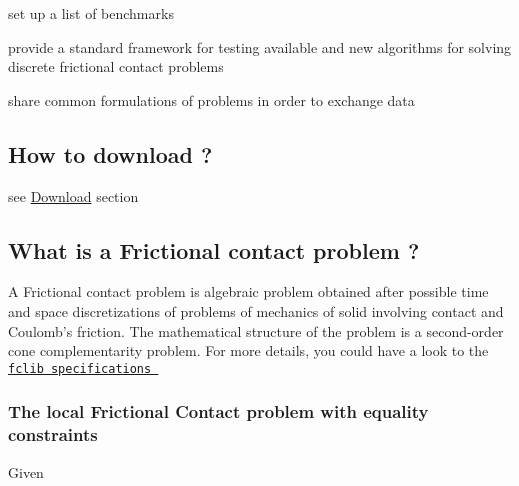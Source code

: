 \begin{DoxyItemize}
\item set up a list of benchmarks  
\item provide a standard framework for testing available and new algorithms for solving discrete frictional contact problems  
\item share common formulations of problems in order to exchange data 
\end{DoxyItemize}\hypertarget{index_howtodownload}{}\subsection{How to download  ?}\label{index_howtodownload}
see \hyperlink{download}{Download} section\hypertarget{index_Wahtis}{}\subsection{What is a Frictional contact problem ?}\label{index_Wahtis}
A Frictional contact problem is algebraic problem obtained after possible time and space discretizations of problems of mechanics of solid involving contact and Coulomb's friction. The mathematical structure of the problem is a second-\/order cone complementarity problem. For more details, you could have a look to the \href{doc/FCLib.pdf}{\tt fclib specifications }\hypertarget{index_Localfclib}{}\subsubsection{The local Frictional Contact problem with equality constraints}\label{index_Localfclib}
Given 
